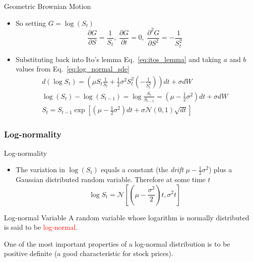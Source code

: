 \documentclass{beamer}
\begin{document}
\begin{frame}{Geometric Brownian Motion}
	\begin{itemize}
		\item So setting $G=\log(S_t)$ 
		\begin{equation*}
			\frac{\partial G}{\partial S}=\frac{1}{S_t},\;\frac{\partial G}{\partial t}=0,\;\frac{\partial^2 G}{\partial S^2}=-\frac{1}{S_t^2}
		\end{equation*}
		\item Substituting back into Ito's lemma Eq.~\ref{eq:itos_lemma} and taking $a$ and $b$ values from Eq.~\ref{eq:log_normal_sde}
		\begin{equation}
			\begin{gathered}
			d(\log S_t) = \left(\mu S_t\frac{1}{S_t} + \frac{1}{2}\sigma^2S_t^2\left(-\frac{1}{S_t^2}\right)\right)dt + \sigma dW \\
			\log(S_t) - \log(S_{t-1}) = \log\frac{S_t}{S_{t-1}}=\left(\mu - \frac{1}{2}\sigma^2\right)dt + \sigma dW \\
			S_t = S_{t-1}\exp\left[\left(\mu-\frac{1}{2}\sigma^2\right)dt + \sigma\mathcal{N}(0,1)\sqrt{dt}\right] 
			\end{gathered}
		\end{equation}
	\end{itemize}
\end{frame}

\subsubsection{Log-normality}
\begin{frame}{Log-normality}
\begin{itemize}
	\item The variation in $\log(S_t)$ equals a constant (the \emph{drift} $\mu-\frac{1}{2}\sigma^2$) plus a Gaussian distributed random variable. Therefore at some time $t$
	\begin{equation*}
		\log S_t = \mathcal{N}\left[\left(\mu -\frac{\sigma^2}{2}\right)t, \sigma^2 t\right]
	\end{equation*}
\end{itemize}
\begin{block}{Log-normal Variable}
A random variable whose logarithm is normally distributed is said to be \textcolor{red}{log-normal}.

One of the most important properties of a log-normal distribution is to be positive definite (a good characteristic for stock prices).
\end{block}
\end{frame}
\end{document}
